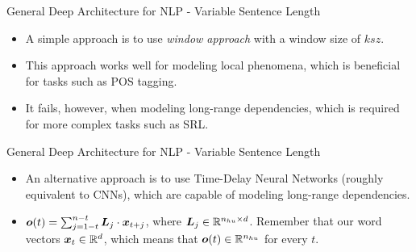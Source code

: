 \documentclass[handout]{beamer} %
\begin{document}
  \begin{frame}{General Deep Architecture for NLP - Variable Sentence Length}
      \begin{itemize}[<+->]
          \item A simple approach is to use \textit{window approach} with a
              window size of $ksz$. 
          \item This approach works well for modeling local phenomena, which
                  is beneficial for tasks such as POS tagging.
          \item It fails, however, when modeling long-range dependencies, which
              is required for more complex tasks such as SRL.
      \end{itemize}


  \end{frame}

  \begin{frame}{General Deep Architecture for NLP - Variable Sentence Length}
      \begin{itemize}[<+->]
          \item An alternative approach is to use Time-Delay Neural Networks
              (roughly equivalent to CNNs), which are capable of modeling
              long-range dependencies.
            \item ${\bm{o}}(t)=\sum_{j=1-t}^{n-t}{{\bm{L}}_j \cdot {\bm{x}}_{t+j}}$, where
                ${\bm{L}}_j\in{\mathbb{R}}^{n_{hu}\times d}$. Remember that our word vectors
                ${\bm{x}}_t\in{\mathbb{R}}^d$, which means that ${\bm{o}}(t)\in{\mathbb{R}}^{n_{hu}}$ for
                every $t$.

      \end{itemize}

  \end{frame}
\end{document}
